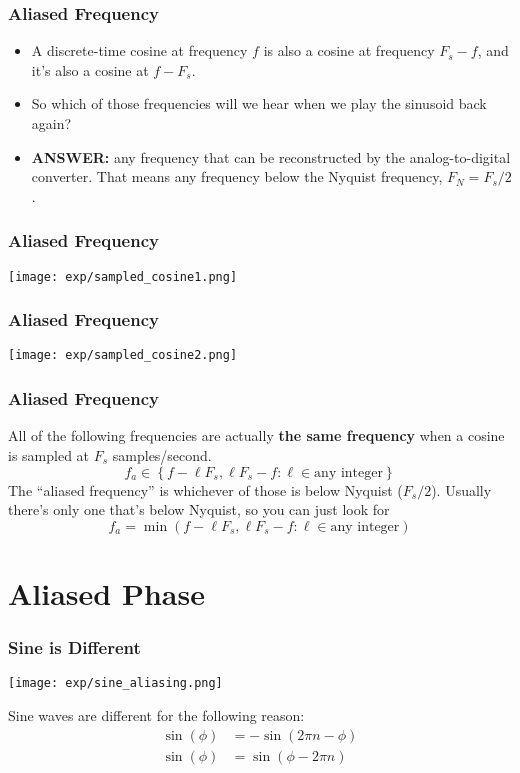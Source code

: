 \documentclass{beamer}
\begin{document}
\begin{frame}
  \frametitle{Aliased Frequency}

  \begin{itemize}
    \item A discrete-time cosine at frequency $f$ is also a cosine at
      frequency $F_s-f$, and it's also a cosine at $f-F_s$.
    \item So which of those frequencies will we hear when we play
      the sinusoid back again?
    \item {\bf ANSWER:} any frequency that can be reconstructed by the
      analog-to-digital converter.  That means any frequency below the
      Nyquist frequency, $F_N=F_s/2$.
  \end{itemize}
  
\end{frame}

\begin{frame}
  \frametitle{Aliased Frequency}
  \centerline{\texttt{[image: exp/sampled\_cosine1.png]}}
\end{frame}
\begin{frame}
  \frametitle{Aliased Frequency}
  \centerline{\texttt{[image: exp/sampled\_cosine2.png]}}
\end{frame}

\begin{frame}
  \frametitle{Aliased Frequency}

  All of the following frequencies are actually {\bf the same
    frequency} when a cosine is sampled at $F_s$ samples/second.
  \[
  f_a \in\left\{f - \ell F_s, \ell F_s - f : \ell\in \mbox{any integer}\right\}
  \]
  The ``aliased frequency'' is whichever of those is below Nyquist
  ($F_s/2$).  Usually there's only one that's below Nyquist, so you
  can just look for
  \[
  f_a =\min\left(f - \ell F_s, \ell F_s - f : \ell\in \mbox{any integer}\right)
  \]
  
\end{frame}

\section[Aliased Phase]{Aliased Phase}
\setcounter{subsection}{1}

\begin{frame}
  \frametitle{Sine is Different}

  \centerline{\texttt{[image: exp/sine\_aliasing.png]}}
  Sine waves are different for the following reason:
  \begin{align*}
    \sin(\phi) &= -\sin(2\pi n -\phi)\\
    \sin(\phi) &= \sin(\phi-2\pi n)
  \end{align*}
\end{frame}
\end{document}
